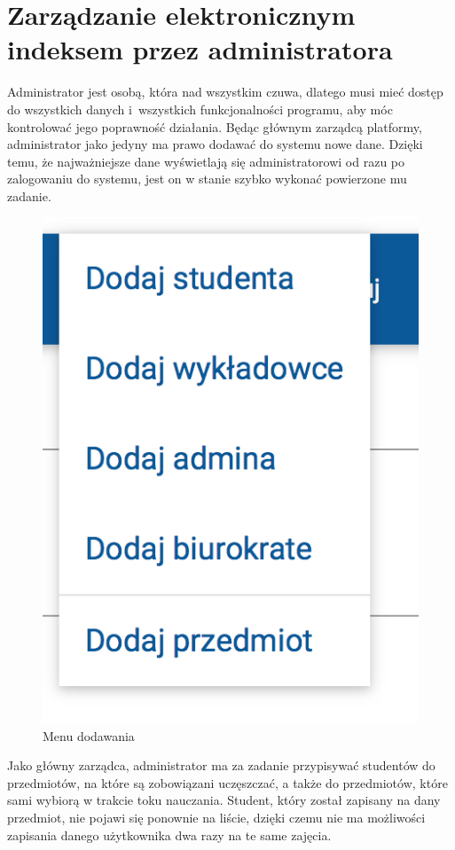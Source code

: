\documentclass[openright]{xmgr}
\begin{document}
\section{Zarządzanie elektronicznym indeksem przez administratora}

\indent \indent \indent Administrator jest osobą, która nad wszystkim czuwa, dlatego musi mieć dostęp do wszystkich danych i~wszystkich funkcjonalności programu, aby móc kontrolować jego poprawność działania. Będąc głównym zarządcą platformy, administrator jako jedyny ma prawo dodawać do systemu nowe dane. Dzięki temu, że najważniejsze dane wyświetlają się administratorowi od razu po zalogowaniu do systemu, jest on w stanie szybko wykonać powierzone mu zadanie.

\begin{figure}[th!]
\centering
\includegraphics[scale=0.6]{images/menu.png}
\caption{Menu dodawania\label{RYS.4}}
\end{figure}


\noindent Jako główny zarządca, administrator ma za zadanie przypisywać studentów do przedmiotów, na które są zobowiązani uczęszczać, a także do przedmiotów, które sami wybiorą w trakcie toku nauczania. Student, który został zapisany na dany przedmiot, nie pojawi się ponownie na liście, dzięki czemu nie ma możliwości zapisania danego użytkownika dwa razy na te same zajęcia.
\end{document}
